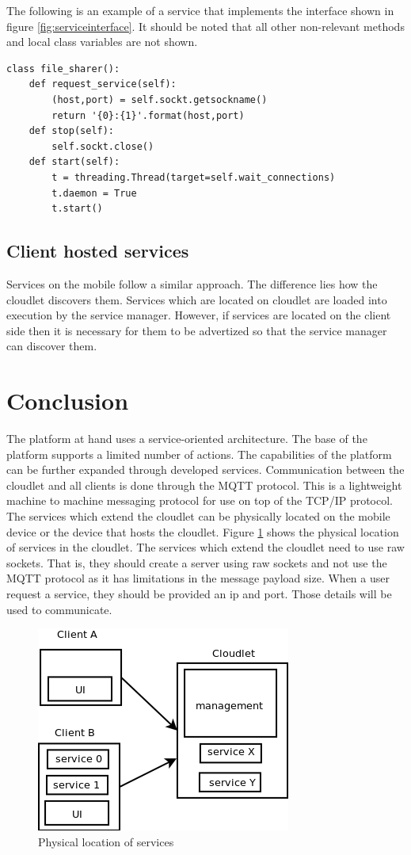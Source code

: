 The following is an example of a service that implements the interface shown in
figure \ref{fig:serviceinterface}. It should be noted that all other non-relevant methods and local class variables are not shown.

\begin{lstlisting}
class file_sharer():
	def request_service(self):
		(host,port) = self.sockt.getsockname()
		return '{0}:{1}'.format(host,port)
	def stop(self):
		self.sockt.close()
	def start(self):
		t = threading.Thread(target=self.wait_connections)
		t.daemon = True
		t.start()
\end{lstlisting}

\subsection{Client hosted services}
Services on the mobile follow a similar approach. The difference lies how the cloudlet discovers them. Services which are located on cloudlet are loaded into execution by the service manager. However, if services are located on the client side then it is necessary for them to be advertized so that the service manager can discover them.


\section{Conclusion}
The platform at hand uses a service-oriented architecture. The base of the platform supports a limited number of actions. The capabilities of the platform can be further expanded through developed services. Communication between the cloudlet and all clients is done through the MQTT protocol. This is a lightweight machine to machine messaging protocol for use on top of the TCP/IP protocol. The services which extend the cloudlet can be physically located on the mobile device or the device that hosts the cloudlet. Figure \ref{fig:protocol} shows the physical location of services in the cloudlet. The services which extend the cloudlet need to use raw sockets. That is, they should create a server using raw sockets and not use the MQTT protocol as it has limitations in the message payload size. When a user request a service, they should be provided an ip and port. Those details will be used to communicate.

\begin{figure}[!h]
\centering
\includegraphics[scale=0.5]{figures/protocol}
\caption{Physical location of services}
\label{fig:protocol}
\end{figure}